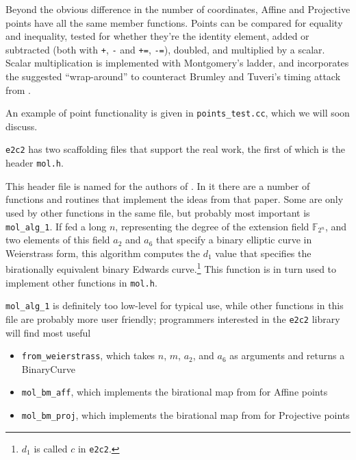 Beyond the obvious difference in the number of coordinates, Affine and
    Projective points have all the same member functions. 
Points can be compared for equality and inequality, tested for whether they're
    the identity element, added or subtracted (both with \texttt{+}, \texttt{-}
    and \texttt{+=}, \texttt{-=}), doubled, and multiplied by a scalar.
Scalar multiplication is implemented with Montgomery's ladder, and incorporates
    the suggested ``wrap-around'' to counteract Brumley and Tuveri's timing
    attack from \cite{brumley2011timing}.

An example of point functionality is given in \texttt{points\_test.cc}, which
    we will soon discuss.


\texttt{e2c2} has two scaffolding files that support the real work, the first
    of which is the header \texttt{mol.h}.


This header file is named for the authors of \cite{moloneyefficient}.
In it there are a number of functions and routines that implement the ideas
    from that paper.
Some are only used by other functions in the same file, but probably most
    important is \texttt{mol\_alg\_1}.
If fed a long $n$, representing the degree of the extension field
    $\mathbb{F}_{2^n}$, and two elements of this field $a_2$ and $a_6$ that
    specify a binary elliptic curve in Weierstrass form, this algorithm
    computes the $d_1$ value that specifies the birationally equivalent binary
    Edwards curve.\footnote{$d_1$ is called $c$ in \texttt{e2c2}.}
This function is in turn used to implement other functions in \texttt{mol.h}.

\texttt{mol\_alg\_1} is definitely too low-level for typical use, while other
functions in this file are probably more user friendly; programmers interested
    in the \texttt{e2c2} library will find most useful
\begin{itemize}
\item \texttt{from\_weierstrass}, which takes $n$, $m$, $a_2$, and $a_6$ as
    arguments and returns a BinaryCurve
\item \texttt{mol\_bm\_aff}, which implements the birational map from
    \cite{moloneyefficient} for Affine points
\item \texttt{mol\_bm\_proj}, which implements the birational map from
    \cite{moloneyefficient} for Projective points
\end{itemize}

